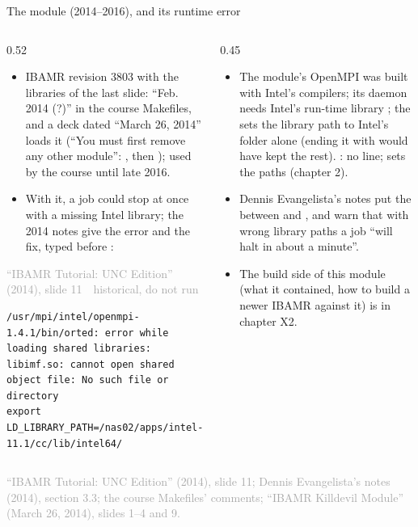 \documentclass[aspectratio=169,11pt]{beamer}
\newcommand{\sourcecredit}[1]{\vfill\begin{flushright}\tiny\textcolor{DarkGray}{#1}\end{flushright}}
\newcommand{\hist}[1]{{\tiny\sffamily\textcolor{DarkGray}{#1\ \textbullet\ historical, do not run}}\par\nointerlineskip\vspace{0.3mm}}
\begin{document}
\begin{frame}[fragile]{The  module (2014--2016), and its runtime error}
\label{fr:m3803}
\begin{columns}[T,onlytextwidth]
\begin{column}{0.52\textwidth}
\footnotesize
\begin{itemize}\setlength{\itemsep}{2pt}
  \item IBAMR revision 3803 with the libraries of the last slide: ``Feb. 2014 (?)'' in the course Makefiles, and a deck dated ``March 26, 2014'' loads it (``You must first remove any other module'': , then ); used by the course until late 2016.
  \item With it, a job could stop at once with a missing Intel library; the 2014 notes give the error and the fix, typed before :
\end{itemize}
\hist{``IBAMR Tutorial: UNC Edition'' (2014), slide 11}
\begin{lstlisting}[style=hist]
/usr/mpi/intel/openmpi-1.4.1/bin/orted: error while loading shared libraries: libimf.so: cannot open shared object file: No such file or directory
export LD_LIBRARY_PATH=/nas02/apps/intel-11.1/cc/lib/intel64/
\end{lstlisting}
\end{column}
\begin{column}{0.45\textwidth}
\footnotesize
\begin{itemize}\setlength{\itemsep}{2pt}
  \item The module's OpenMPI was built with Intel's compilers; its daemon  needs Intel's run-time library ; the  sets the library path to Intel's folder alone (ending it with  would have kept the rest). : no  line;  sets the paths (chapter 2).
  \item Dennis Evangelista's notes put the  between  and , and warn that with wrong library paths a job ``will halt in about a minute''.
  \item The build side of this module (what it contained, how to build a newer IBAMR against it) is in chapter X2.
\end{itemize}
\end{column}
\end{columns}
\sourcecredit{``IBAMR Tutorial: UNC Edition'' (2014), slide 11; Dennis Evangelista's notes (2014), section 3.3; the course Makefiles' comments; ``IBAMR Killdevil Module'' (March 26, 2014), slides 1--4 and 9.}
\end{frame}
\end{document}
